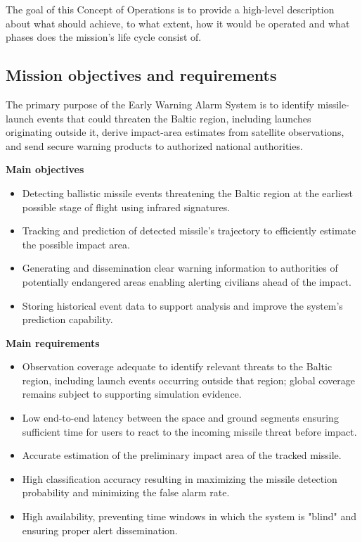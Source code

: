 The goal of this Concept of Operations is to provide a high-level description about what  should achieve, to what extent, how it would be operated and what phases does the mission's life cycle consist of. 

\subsection{Mission objectives and requirements}

The primary purpose of the Early Warning Alarm System is to identify missile-launch events that could threaten the Baltic region, including launches originating outside it, derive impact-area estimates from satellite observations, and send secure warning products to authorized national authorities. 

\textbf{Main objectives}

\begin{itemize}
    \item Detecting ballistic missile events threatening the Baltic region at the earliest possible stage of flight using infrared signatures. 

    \item Tracking and prediction of detected missile's trajectory to efficiently estimate the possible impact area. 

    \item Generating and dissemination clear warning information to authorities of potentially endangered areas enabling alerting civilians ahead of the impact. 

    \item Storing historical event data to support analysis and improve the system's prediction capability. 
\end{itemize}

\textbf{Main requirements}

\begin{itemize}
    \item Observation coverage adequate to identify relevant threats to the Baltic region, including launch events occurring outside that region; global coverage remains subject to supporting simulation evidence. 
    
    \item Low end-to-end latency between the space and ground segments ensuring sufficient time for users to react to the incoming missile threat before impact. 

    \item Accurate estimation of the preliminary impact area of the tracked missile. 

    \item High classification accuracy resulting in maximizing the missile detection probability and minimizing the false alarm rate. 

    \item High availability, preventing time windows in which the system is "blind" and ensuring proper alert dissemination. 
\end{itemize}

